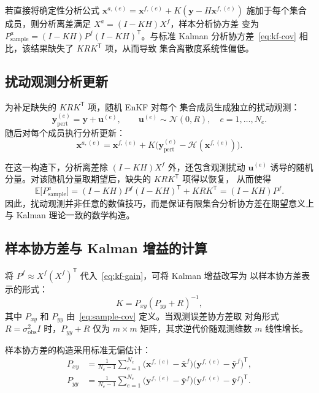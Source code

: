 \documentclass[12pt,a4paper]{article}
\newcommand{\x}{\bm{x}}
\newcommand{\y}{\bm{y}}
\newcommand{\T}{^{\mathsf T}}
\newcommand{\calH}{\mathcal{H}}
\begin{document}
若直接将确定性分析公式 $\x^{a,(e)} = \x^{f,(e)} + K(\y - H\x^{f,(e)})$
施加于每个集合成员，则分析离差满足 $X^a = (I - KH)X^f$，样本分析协方差
变为 $P^a_{\mathrm{sample}} = (I - KH)P^f(I - KH)\T$。与标准 Kalman
分析协方差~\eqref{eq:kf-cov} 相比，该结果缺失了 $K R K\T$ 项，从而导致
集合离散度系统性偏低。

\subsection{扰动观测分析更新}

为补足缺失的 $K R K\T$ 项，随机 EnKF \cite{burgers1998analysis} 对每个
集合成员生成独立的扰动观测：
\begin{equation}
  \y^{(e)}_{\mathrm{pert}} = \y + \bm{u}^{(e)},
  \qquad \bm{u}^{(e)} \sim \mathcal{N}(0, R),\quad
  e = 1, \dots, N_e.
  \label{eq:pert-obs}
\end{equation}
随后对每个成员执行分析更新：
\begin{equation}
  \x^{a,(e)} = \x^{f,(e)} + K\bigl(\y^{(e)}_{\mathrm{pert}} - \calH(\x^{f,(e)})\bigr).
  \label{eq:enkf-update}
\end{equation}

在这一构造下，分析离差除 $(I - KH)X^f$ 外，还包含观测扰动 $\bm{u}^{(e)}$
诱导的随机分量。对该随机分量取期望后，缺失的 $K R K\T$ 项得以恢复，
从而使得
\[
  \mathbb{E}\bigl[P^a_{\mathrm{sample}}\bigr]
  = (I - KH)P^f(I - KH)\T + K R K\T
  = (I - KH)P^f.
\]
因此，扰动观测并非任意的数值技巧，而是保证有限集合分析协方差在期望意义上
与 Kalman 理论一致的数学构造。

\subsection{样本协方差与 Kalman 增益的计算}

将 $P^f \approx X^f(X^f)\T$ 代入~\eqref{eq:kf-gain}，可将 Kalman 增益改写为
以样本协方差表示的形式：
\begin{equation}
  K = P_{xy}(P_{yy} + R)^{-1},
  \label{eq:enkf-K}
\end{equation}
其中 $P_{xy}$ 和 $P_{yy}$ 由~\eqref{eq:sample-cov} 定义。当观测误差协方差取
对角形式 $R = \sigma_{\mathrm{obs}}^2 I$ 时，$P_{yy} + R$ 仅为 $m \times m$
矩阵，其求逆代价随观测维数 $m$ 线性增长。

样本协方差的构造采用标准无偏估计：
\begin{align}
  P_{xy} &= \frac{1}{N_e - 1}
    \sum_{e=1}^{N_e}
    \bigl(\x^{f,(e)} - \bar{\x}^f\bigr)
    \bigl(\y^{f,(e)} - \bar{\y}^f\bigr)\T, \label{eq:Pxy-sum} \\
  P_{yy} &= \frac{1}{N_e - 1}
    \sum_{e=1}^{N_e}
    \bigl(\y^{f,(e)} - \bar{\y}^f\bigr)
    \bigl(\y^{f,(e)} - \bar{\y}^f\bigr)\T. \label{eq:Pyy-sum}
\end{align}
\end{document}

